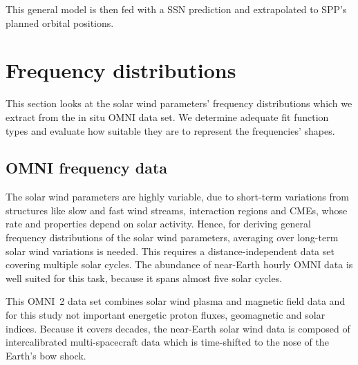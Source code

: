 This general model is then fed with a SSN prediction and extrapolated to SPP's planned orbital positions.\\


\section{Frequency distributions}
\label{sec:frequency_distribution}

This section looks at the solar wind parameters' frequency distributions which we extract from the in situ OMNI data set. We determine adequate fit function types and evaluate how suitable they are to represent the frequencies' shapes.

\subsection{OMNI frequency data}
\label{sec:omni_frequency_data}
The solar wind parameters are highly variable, due to short-term variations from structures like slow and fast wind streams, interaction regions and CMEs, whose rate and properties depend on solar activity. Hence, for deriving general frequency distributions of the solar wind parameters, averaging over long-term solar wind variations is needed. This requires a distance-independent data set covering multiple solar cycles. The abundance of near-Earth hourly OMNI data is well suited for this task, because it spans almost five solar cycles.

This OMNI~2 data set \citep{King2005} combines solar wind plasma and magnetic field data and for this study not important energetic proton fluxes, geomagnetic and solar indices. Because it covers decades, the near-Earth solar wind data is composed of intercalibrated multi-spacecraft data which is time-shifted to the nose of the Earth's bow shock.

